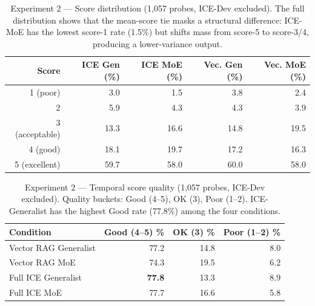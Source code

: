 \documentclass[10pt]{article}
\begin{document}
\begin{table}[htbp]
\centering
\small
\caption{Experiment 2 --- Score distribution (1,057 probes, ICE-Dev excluded). The full distribution shows that the mean-score tie masks a structural difference: ICE-MoE has the lowest score-1 rate (1.5\%) but shifts mass from score-5 to score-3/4, producing a lower-variance output.}
\label{tab:exp2-score-dist}
\begin{tabular}{rrrrr}
\toprule
\textbf{Score} & \textbf{ICE Gen (\%)} & \textbf{ICE MoE (\%)} & \textbf{Vec. Gen (\%)} & \textbf{Vec. MoE (\%)} \\
\midrule
1 (poor)      & 3.0 & 1.5 & 3.8 & 2.4 \\
2             & 5.9 & 4.3 & 4.3 & 3.9 \\
3 (acceptable)& 13.3 & 16.6 & 14.8 & 19.5 \\
4 (good)      & 18.1 & 19.7 & 17.2 & 16.3 \\
5 (excellent) & 59.7 & 58.0 & 60.0 & 58.0 \\
\bottomrule
\end{tabular}
\end{table}

\begin{table}[htbp]
\centering
\small
\caption{Experiment 2 --- Temporal score quality (1,057 probes, ICE-Dev excluded). Quality buckets: Good (4--5), OK (3), Poor (1--2). ICE-Generalist has the highest Good rate (77.8\%) among the four conditions.}
\label{tab:exp2-temporal}
\begin{tabular}{lrrr}
\toprule
\textbf{Condition} & \textbf{Good (4--5) \%} & \textbf{OK (3) \%} & \textbf{Poor (1--2) \%} \\
\midrule
Vector RAG Generalist  & 77.2 & 14.8 & 8.0 \\
Vector RAG MoE         & 74.3 & 19.5 & 6.2 \\
Full ICE Generalist    & \textbf{77.8} & 13.3 & 8.9 \\
Full ICE MoE           & 77.7 & 16.6 & 5.8 \\
\bottomrule
\end{tabular}
\end{table}
\end{document}
